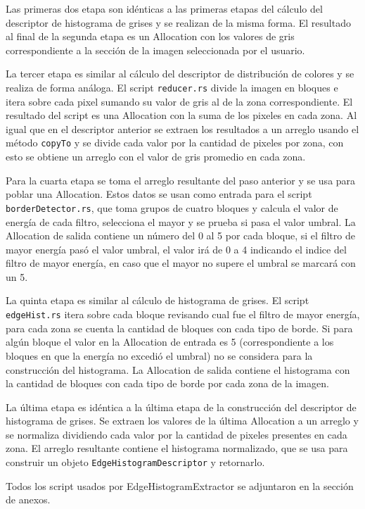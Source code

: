 Las primeras dos etapa son idénticas a las primeras etapas del cálculo del descriptor de histograma de grises y se realizan de la misma forma. El resultado al final de la segunda etapa es un Allocation con los valores de gris correspondiente a la sección de la imagen seleccionada por el usuario.

La tercer etapa es similar al cálculo del descriptor de distribución de colores y se realiza de forma análoga. El script \texttt{reducer.rs} divide la imagen en bloques e itera sobre cada pixel sumando su valor de gris al de la zona correspondiente. El resultado del script es una Allocation con la suma de los pixeles en cada zona. Al igual que en el descriptor anterior se extraen los resultados a un arreglo usando el método \texttt{copyTo} y se divide cada valor por la cantidad de pixeles por zona, con esto se obtiene un arreglo con el valor de gris promedio en cada zona.

Para la cuarta etapa se toma el arreglo resultante del paso anterior y se usa para poblar una Allocation. Estos datos se usan como entrada para el script \texttt{borderDetector.rs}, que toma grupos de cuatro bloques y calcula el valor de energía de cada filtro, selecciona el mayor y se prueba si pasa el valor umbral. La Allocation de salida contiene un número del 0 al 5 por cada bloque, si el filtro de mayor energía pasó el valor umbral, el valor irá de 0 a 4 indicando el indice del filtro de mayor energía, en caso que el mayor no supere el umbral se marcará con un 5.

La quinta etapa es similar al cálculo de histograma de grises. El script \texttt{edgeHist.rs} itera sobre cada bloque revisando cual fue el filtro de mayor energía, para cada zona se cuenta la cantidad de bloques con cada tipo de borde. Si para algún bloque el valor en la Allocation de entrada es 5 (correspondiente a los bloques en que la energía no excedió el umbral) no se considera para la construcción del histograma. La Allocation de salida contiene el histograma con la cantidad de bloques con cada tipo de borde por cada zona de la imagen.

La última etapa es idéntica a la última etapa de la construcción del descriptor de histograma de grises. Se extraen los valores de la última Allocation a un arreglo y se normaliza dividiendo cada valor por la cantidad de pixeles presentes en cada zona. El arreglo resultante contiene el histograma normalizado, que se usa para construir un objeto \texttt{EdgeHistogramDescriptor} y retornarlo.

Todos los script usados por EdgeHistogramExtractor se adjuntaron en la sección de anexos.\\

